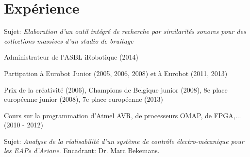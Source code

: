 \documentclass[a4paper]{deedy-resume} %
\begin{document}
\begin{minipage}[t]{0.74\textwidth} %
	


\section{Expérience}

Sujet: \textit{Elaboration d'un outil intégré de recherche par similarités sonores pour des collections massives d'un studio de bruitage}
\sectionspace %


\vspace{\topsep} %
\begin{tightitemize}
	\item Administrateur de l'ASBL iRobotique (2014)
	\item Partipation à Eurobot Junior (2005, 2006, 2008) et à Eurobot (2011, 2013)
	\item Prix de la créativité (2006), Champions de Belgique junior (2008), 8e place européenne junior (2008), 7e place européenne (2013)
	\item Cours sur la programmation d'Atmel AVR, de processeurs OMAP, de FPGA,... (2010 - 2012)
\end{tightitemize}

\sectionspace %



Sujet: \textit{Analyse de la réalisabilité d'un système de contrôle électro-mécanique pour les EAPs d'Ariane}. Encadrant: Dr. Marc Bekemans.

\sectionspace %



\end{minipage}
\end{document}
